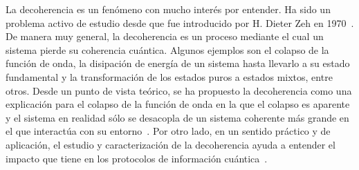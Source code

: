 La decoherencia es un fenómeno con mucho interés por entender. 
Ha sido un problema activo de estudio desde que 
fue introducido por H. Dieter Zeh en 1970~\cite{zeh1970interpretation}.
De manera muy general, la decoherencia es un proceso mediante el cual 
un sistema pierde su coherencia cuántica. 
Algunos ejemplos son el colapso de 
la función de onda, la disipación de energía 
de un sistema hasta llevarlo a su estado fundamental y la transformación de los 
estados puros a estados mixtos, entre otros.
Desde un punto de vista teórico, se ha propuesto la decoherencia 
como una explicación para el colapso de la función de onda en la que el 
colapso es aparente y el 
sistema en realidad sólo se desacopla de un sistema coherente más grande
en el que interactúa con su entorno~\cite{schlosshauer2007decoherence}.
Por otro lado, en un sentido práctico y de aplicación, 
el estudio y caracterización de la decoherencia 
ayuda a entender el impacto que tiene en los protocolos de información 
cuántica~\cite{pepino2011open}. 

%   


